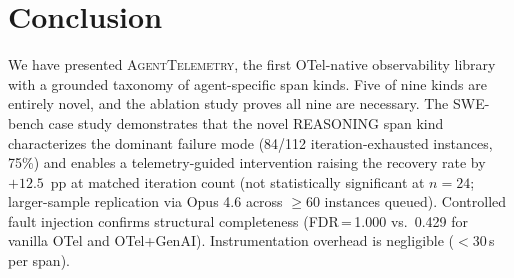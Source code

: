 \documentclass[11pt]{article}
\begin{document}
\section{Conclusion}
\label{sec:conclusion}

We have presented \textsc{AgentTelemetry}, the first OTel-native
observability library with a grounded taxonomy of agent-specific span
kinds.  Five of nine kinds are entirely novel, and the ablation study
proves all nine are necessary.  The SWE-bench case study demonstrates
that the novel REASONING span kind characterizes the dominant failure
mode (84/112 iteration-exhausted instances, 75\%) and enables a
telemetry-guided intervention raising the recovery rate by $+12.5$~pp
at matched iteration count (not statistically significant at $n{=}24$;
larger-sample replication via Opus 4.6 across $\geq{}60$ instances
queued).  Controlled fault injection confirms structural completeness
(FDR\,=\,1.000 vs.\ 0.429 for vanilla OTel and OTel+GenAI).
Instrumentation overhead is negligible ($<$30\,\textmu s per span).
\end{document}
